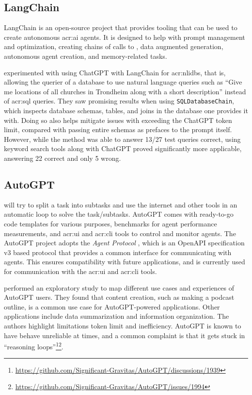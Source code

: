 \subsection{LangChain}\label{subsubsec:langchain}

LangChain \citep{chaseLangChain2022} is an open-source project that provides tooling that can be used to create autonomous \acrshort{acr:ai} agents. It is designed to help with prompt management and optimization, creating chains of calls to , data augmented generation, autonomous agent creation, and memory-related tasks.

\cite{nascimentoFamilyNaturalLanguage} experimented with using ChatGPT with LangChain for \glspl{acr:nlidb}, that is, allowing the querier of a database to use natural language queries such as \enquote{Give me locations of all churches in Trondheim along with a short description} instead of \acrshort{acr:sql} queries. They saw promising results when using \texttt{SQLDatabaseChain}, which inspects database schemas, tables, and joins in the database one provides it with. Doing so also helps mitigate issues with exceeding the ChatGPT token limit, compared with passing entire schemas as prefaces to the prompt itself. However, while the method was able to answer 13/27 test queries correct, using keyword search tools along with ChatGPT proved significantly more applicable, answering 22 correct and only 5 wrong.

\subsection{AutoGPT}\label{subsubsec:autogpt}

\cite{richardAutoGPTHeartOpensource2023} will try to split a task into subtasks and use the internet and other tools in an automatic loop to solve the task/subtasks. AutoGPT comes with ready-to-go code templates for various purposes, benchmarks for agent performance measurements, and \acrshort{acr:ui} and \acrshort{acr:cli} tools to control and monitor agents. The AutoGPT project adopts the  \textit{Agent Protocol} \cite{AgentProtocol}, which is an OpenAPI specification v3 based protocol that provides a common interface for communicating with agents. This ensures compatibility with future applications, and is currently used for communication with the \acrshort{acr:ui} and \acrshort{acr:cli} tools.

\cite{firatWhatIfGPT42023} performed an exploratory study to map different use cases and experiences of AutoGPT users. They found that content creation, such as making a podcast outline, is a common use case for AutoGPT-powered applications. Other applications include data summarization and information organization. The authors highlight limitations token limit and inefficiency. AutoGPT is known to have behave unreliable at times, and a common complaint is that it gets stuck in \enquote{reasoning loops}\footnote{\url{https://github.com/Significant-Gravitas/AutoGPT/discussions/1939}}\footnote{\url{https://github.com/Significant-Gravitas/AutoGPT/issues/1994}}.

